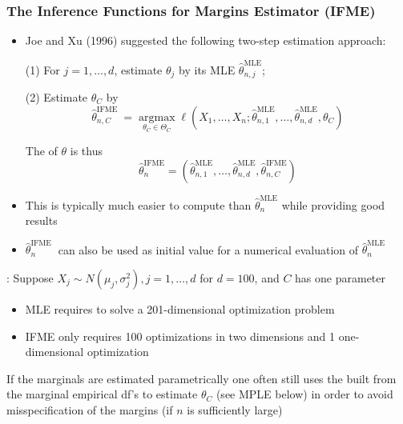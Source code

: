\subsubsection*{The Inference Functions for Margins Estimator (IFME)}
\begin{itemize}[leftmargin=*]
    \item Joe and Xu (1996) suggested the following two-step estimation approach:
    
(1) For $j=1, \ldots, d$, estimate $\theta_{j}$ by its MLE $\hat{\theta}_{n, j}^{\mathrm{MLE}}$; 

(2) Estimate $\theta_{C}$ by
$$
\hat{\theta}_{n, C}^{\text {IFME }}=\underset{\theta_{C} \in \Theta_{C}}{\operatorname{argmax}} \ell\left(X_{1}, \ldots, X_{n} ; \hat{\theta}_{n, 1}^{\mathrm{MLE}}, \ldots, \hat{\theta}_{n, d}^{\mathrm{MLE}}, \theta_{C}\right)
$$

The  of $\theta$ is thus
$$
\hat{\theta}_{n}^{\mathrm{IFME}}=\left(\hat{\theta}_{n, 1}^{\mathrm{MLE}}, \ldots, \hat{\theta}_{n, d}^{\mathrm{MLE}}, \hat{\theta}_{n, C}^{\mathrm{IFME}}\right)
$$
    \item This is typically much easier to compute than $\hat{\theta}_{n}^{\mathrm{MLE}}$ while providing good results
    \item $\hat{\theta}_{n}^{\text {IFME }}$ can also be used as initial value for a numerical evaluation of $\hat{\theta}_{n}^{\mathrm{MLE}}$
\end{itemize}

: Suppose $X_{j} \sim N\left(\mu_{j}, \sigma_{j}^{2}\right), j=1, \ldots, d$ for $d=100$, and $C$ has one parameter
\begin{itemize}[leftmargin=*]
    \item MLE requires to solve a 201-dimensional optimization problem
    \item IFME only requires 100 optimizations in two dimensions and 1 one-dimensional optimization
\end{itemize}
If the marginals are estimated parametrically one often still uses the  built from the marginal empirical df's to estimate $\theta_{C}$ (see MPLE below) in order to avoid misspecification of the margins (if $n$ is sufficiently large)










